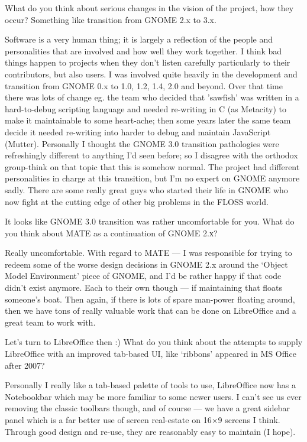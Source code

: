 \documentclass[10pt, a5paper]{article}
\begin{document}
\begin{Parallel}[p]{}{}
{\q What do you think about serious changes in the vision of the project, how they occur? Something like transition from GNOME 2.x to 3.x.

\a Software is a very human thing; it is largely a reflection of the people and personalities that are involved and how well they work together. I think bad things happen to projects when they don't listen carefully particularly to their contributors, but also users. I was involved quite heavily in the development and transition from GNOME 0.x to 1.0, 1.2, 1.4, 2.0 and beyond. Over that time there was lots of change eg. the team who decided that 'sawfish' was written in a hard-to-debug scripting language and needed re-writing in C (as Metacity) to make it maintainable to some heart-ache; then some years later the same team decide it needed re-writing into harder to debug and maintain JavaScript (Mutter). Personally I thought the GNOME 3.0 transition pathologies were refreshingly different to anything I'd seen before; so I disagree with the orthodox group-think on that topic that this is somehow normal. The project had different personalities in charge at this transition, but I'm no expert on GNOME anymore sadly. There are some really great guys who started their life in GNOME who now fight at the cutting edge of other big problems in the FLOSS world.

\q It looks like GNOME 3.0 transition was rather uncomfortable for you. What do you think about MATE as a continuation of GNOME 2.х?

\a Really uncomfortable. With regard to MATE — I was responsible for trying to redeem some of the worse design decisions in GNOME 2.x around the ‘Object Model Environment’ piece of GNOME, and I'd be rather happy if that code didn't exist anymore. Each to their own though — if maintaining that floats someone's boat. Then again, if there is lots of spare man-power floating around, then we have tons of really valuable work that can be done on LibreOffice and a great team to work with.

\q Let's turn to LibreOffice then :) What do you think about the attempts to supply LibreOffice with an improved tab-based UI, like ‘ribbons’ appeared in MS Office after 2007?

\a Personally I really like a tab-based palette of tools to use, LibreOffice now has a Notebookbar which may be more familiar to some newer users. I can't see us ever removing the classic toolbars though, and of course — we have a great sidebar panel which is a far better use of screen real-estate on 16×9 screens I think. Through good design and re-use, they are reasonably easy to maintain (I hope).

}
\end{Parallel}
\end{document}

